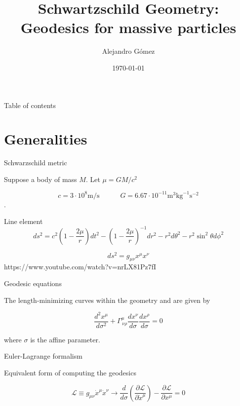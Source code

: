 \documentclass[xcolor=dvipsnames]{beamer}
\title[Schwartzschild geometry]{Schwartzschild Geometry: Geodesics for massive particles}
\date{\today}
\author[Universidad del Valle]{Alejandro Gómez }
\institute[]{Universidad del Valle \\ Departamento de física}
\begin{document}
	
	\begin{frame}
		\titlepage
	\end{frame}
	
	\begin{frame}{Table of contents}
    \tableofcontents
	\end{frame}
	
	
\section{Generalities}

\begin{frame}{Schwarzschild metric}

Suppose a body of mass $M$. Let $\mu = GM/c^2$

$$c = 3\cdot 10^8 \text{m/s} \qquad \quad G = 6.67 \cdot 10^{-11} \text{m}^3 \text{kg}^{-1} \text{s}^{-2}$$.

\begin{block}{Line element}
\begin{equation*}
	ds^2 = c^2 \left( 1 - \frac{2\mu}{r}\right) dt^2 - \left( 1 - \frac{2\mu}{r}\right)^{-1} dr^2 - r^2 d\theta^2 - r^2 \sin^2 \theta d\phi^2
\end{equation*}
\end{block}

\begin{equation*}
    ds^2 = g_{\mu \nu} x^\mu x^\nu
\end{equation*}
https://www.youtube.com/watch?v=nrLX81Pz7fI
\end{frame}


\begin{frame}{Geodesic equations}

The length-minimizing curves within the geometry and are given by

\begin{equation*}
    \frac{d^2 x^\mu}{d\sigma^2} + \Gamma^\mu_{\, \nu \rho} \frac{dx^\nu}{d\sigma} \frac{dx^\rho}{d\sigma} = 0
\end{equation*}

where $\sigma$ is the affine parameter.

\begin{block}{Euler-Lagrange formalism}

Equivalent form of computing the geodesics

\begin{equation*}
	\mathcal{L} \equiv g_{\mu \nu} \dot{x}^\mu \dot{x}^\nu  \longrightarrow \frac{d}{d\sigma} \left( \frac{\partial \mathcal{L}}{\partial \dot{x}^\mu} \right) - \frac{\partial \mathcal{L}}{\partial x^\mu} = 0
\end{equation*}
\end{block}

\end{frame}
\end{document}
